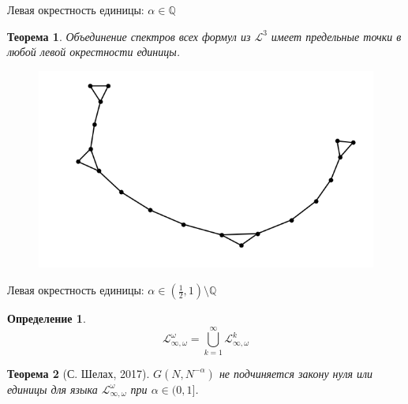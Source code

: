 \documentclass[aspectratio=169,hyperref={unicode},notheorems]{beamer}
\newtheorem {theorem}{Теорема}
\theoremstyle{definition}
\newtheorem {definition}{Определение}
\def \LL     {\mathcal{L}}
\def \Q    {\mathbb {Q}}
\def \Gna {G\left(N,N^{-\alpha}\right)}
\begin{document}
\begin{frame}{Левая окрестность единицы: $\alpha \in \Q$}
\begin{theorem}
Объединение спектров всех формул из $\LL^3$ имеет предельные точки в любой левой окрестности единицы.
\end{theorem}
\begin{figure}
    \centering
    \includegraphics[scale=0.3]{picrel/Hksm.png}
\end{figure}
\end{frame}

\begin{frame}{Левая окрестность единицы: $\alpha \in (\frac{1}{2},1) \setminus \Q$}

\begin{definition}
    \[\LL^\omega_{ \infty,\omega} = \bigcup_{k=1}^\infty \LL^k_{ \infty,\omega}\]
\end{definition}

\begin{theorem}[С. Шелах, 2017]
$\Gna$ не подчиняется закону нуля или единицы для языка $\LL^\omega_{ \infty,\omega}$ при $\alpha \in (0, 1]$.
\end{theorem}

\end{frame}
\end{document}
